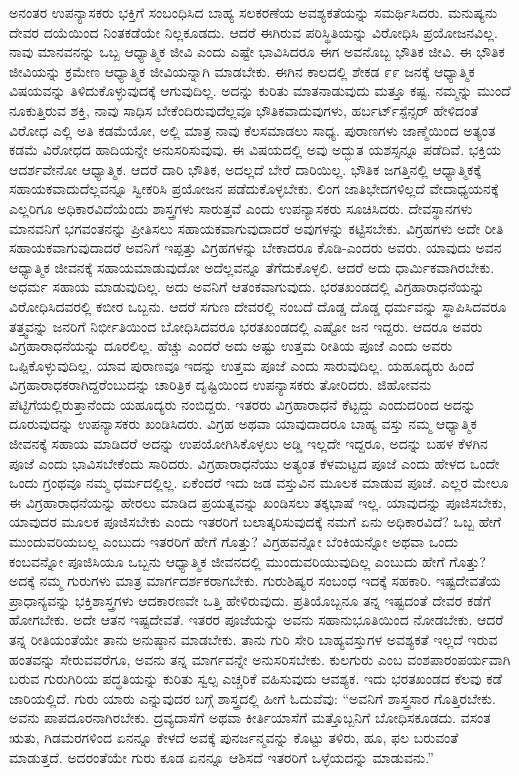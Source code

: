 ಅನಂತರ ಉಪನ್ಯಾಸಕರು ಭಕ್ತಿಗೆ ಸಂಬಂಧಿಸಿದ ಬಾಹ್ಯ ಸಲಕರಣೆಯ ಅವಶ್ಯಕತೆಯನ್ನು ಸಮರ್ಥಿಸಿದರು. ಮನುಷ್ಯನು ದೇವರ ದಯೆಯಿಂದ ನಿಂತಕಡೆಯೇ ನಿಲ್ಲಕೂಡದು. ಆದರೆ ಈಗಿರುವ ಪರಿಸ್ಥಿತಿಯನ್ನು ವಿರೋಧಿಸಿ ಪ್ರಯೋಜನವಿಲ್ಲ. ನಾವು ಮಾನವನನ್ನು ಒಬ್ಬ ಆಧ್ಯಾತ್ಮಿಕ ಜೀವಿ ಎಂದು ಎಷ್ಟೇ ಭಾವಿಸಿದರೂ ಈಗ ಅವನೊಬ್ಬ ಭೌತಿಕ ಜೀವಿ. ಈ ಭೌತಿಕ ಜೀವಿಯನ್ನು ಕ್ರಮೇಣ ಆಧ್ಯಾತ್ಮಿಕ ಜೀವಿಯನ್ನಾಗಿ ಮಾಡಬೇಕು. ಈಗಿನ ಕಾಲದಲ್ಲಿ ಶೇಕಡ ೯೯ ಜನಕ್ಕೆ ಆಧ್ಯಾತ್ಮಿಕ ವಿಷಯವನ್ನು ತಿಳಿದುಕೊಳ್ಳುವುದಕ್ಕೆ ಆಗುವುದಿಲ್ಲ. ಅದನ್ನು ಕುರಿತು ಮಾತನಾಡುವುದು ಮತ್ತೂ ಕಷ್ಟ. ನಮ್ಮನ್ನು ಮುಂದೆ ನೂಕುತ್ತಿರುವ ಶಕ್ತಿ, ನಾವು ಸಾಧಿಸ ಬೇಕೆಂದಿರುವುದೆಲ್ಲವೂ ಭೌತಿಕವಾದುವುಗಳು, ಹರ್ಬರ್ಟ್​ ಸ್ಪೆನ್ಸರ್​ ಹೇಳಿದಂತೆ ವಿರೋಧ ಎಲ್ಲಿ ಅತಿ ಕಡಮೆಯೋ, ಅಲ್ಲಿ ಮಾತ್ರ ನಾವು ಕೆಲಸಮಾಡಲು ಸಾಧ್ಯ. ಪುರಾಣಗಳು ಜಾಣ್ಮೆಯಿಂದ ಅತ್ಯಂತ ಕಡಮೆ ವಿರೋಧದ ಹಾದಿಯನ್ನೇ ಅನುಸರಿಸುವುವು. ಈ ವಿಷಯದಲ್ಲಿ ಅವು ಅದ್ಭುತ ಯಶಸ್ಸನ್ನೂ ಪಡೆದಿವೆ. ಭಕ್ತಿಯ ಆದರ್ಶವೇನೋ ಆಧ್ಯಾತ್ಮಿಕ. ಆದರೆ ದಾರಿ ಭೌತಿಕ, ಅದಲ್ಲದೆ ಬೇರೆ ದಾರಿಯಿಲ್ಲ. ಭೌತಿಕ ಜಗತ್ತಿನಲ್ಲಿ ಆಧ್ಯಾತ್ಮಿಕಕ್ಕೆ ಸಹಾಯಕವಾದುದೆಲ್ಲವನ್ನೂ ಸ್ವೀಕರಿಸಿ ಪ್ರಯೋಜನ ಪಡೆದುಕೊಳ್ಳಬೇಕು. ಲಿಂಗ ಜಾತಿಭೇದಗಳಿಲ್ಲದೆ ವೇದಾಧ್ಯಯನಕ್ಕೆ ಎಲ್ಲರಿಗೂ ಅಧಿಕಾರವಿದೆಯೆಂದು ಶಾಸ್ತ್ರಗಳು ಸಾರುತ್ತವೆ ಎಂದು ಉಪನ್ಯಾಸಕರು ಸೂಚಿಸಿದರು. ದೇವಸ್ಥಾನಗಳು ಮಾನವನಿಗೆ ಭಗವಂತನನ್ನು ಪ್ರೀತಿಸಲು ಸಹಾಯಕವಾಗುವುದಾದರೆ ಅವುಗಳನ್ನು ಕಟ್ಟಿಸಬೇಕು. ವಿಗ್ರಹಗಳು ಅದೇ ರೀತಿ ಸಹಾಯಕವಾಗುವುದಾದರೆ ಅವನಿಗೆ ಇಪ್ಪತ್ತು ವಿಗ್ರಹಗಳನ್ನು ಬೇಕಾದರೂ ಕೊಡಿ-ಎಂದರು ಅವರು. ಯಾವುದು ಅವನ ಆಧ್ಯಾತ್ಮಿಕ ಜೀವನಕ್ಕೆ ಸಹಾಯಮಾಡುವುದೋ ಅದೆಲ್ಲವನ್ನೂ ತೆಗೆದುಕೊಳ್ಳಲಿ. ಆದರೆ ಅದು ಧಾರ್ಮಿಕವಾಗಿರಬೇಕು. ಅಧರ್ಮ ಸಹಾಯ ಮಾಡುವುದಿಲ್ಲ. ಅದು ಅವನಿಗೆ ಆತಂಕವಾಗುವುದು. ಭರತಖಂಡದಲ್ಲಿ ವಿಗ್ರಹಾರಾಧನೆಯನ್ನು ವಿರೋಧಿಸಿದವರಲ್ಲಿ ಕಬೀರ ಒಬ್ಬನು. ಆದರೆ ಸಗುಣ ದೇವರಲ್ಲಿ ನಂಬದೆ ದೊಡ್ಡ ದೊಡ್ಡ ಧರ್ಮವನ್ನು ಸ್ಥಾಪಿಸಿದವರೂ ತತ್ತ್ವವನ್ನು ಜನರಿಗೆ ನಿರ್ಭೀತಿಯಿಂದ ಬೋಧಿಸಿದವರೂ ಭರತಖಂಡದಲ್ಲಿ ಎಷ್ಟೋ ಜನ ಇದ್ದರು. ಆದರೂ ಅವರು ವಿಗ್ರಹಾರಾಧನೆಯನ್ನು ದೂರಲಿಲ್ಲ. ಹೆಚ್ಚು ಎಂದರೆ ಅದು ಅಷ್ಟು ಉತ್ತಮ ರೀತಿಯ ಪೂಜೆ ಎಂದು ಅವರು ಒಪ್ಪಿಕೊಳ್ಳುವುದಿಲ್ಲ. ಯಾವ ಪುರಾಣವೂ ಇದನ್ನು ಉತ್ತಮ ಪೂಜೆ ಎಂದು ಸಾರುವುದಿಲ್ಲ. ಯಹೂದ್ಯರು ಹಿಂದೆ ವಿಗ್ರಹಾರಾಧಕರಾಗಿದ್ದರೆಂಬುದನ್ನು ಚಾರಿತ್ರಿಕ ದೃಷ್ಟಿಯಿಂದ ಉಪನ್ಯಾಸಕರು ತೋರಿದರು. ಜಿಹೋವನು ಪೆಟ್ಟಿಗೆಯಲ್ಲಿರುತ್ತಾನೆಂದು ಯಹೂದ್ಯರು ನಂಬಿದ್ದರು. ಇತರರು ವಿಗ್ರಹಾರಾಧನೆ ಕೆಟ್ಟದ್ದು ಎಂದುದರಿಂದ ಅದನ್ನು ದೂರುವುದನ್ನು ಉಪನ್ಯಾಸಕರು ಖಂಡಿಸಿದರು. ವಿಗ್ರಹ ಅಥವಾ ಯಾವುದಾದರೂ ಬಾಹ್ಯ ವಸ್ತು ನಮ್ಮ ಆಧ್ಯಾತ್ಮಿಕ ಜೀವನಕ್ಕೆ ಸಹಾಯ ಮಾಡಿದರೆ ಅದನ್ನು ಉಪಯೋಗಿಸಿಕೊಳ್ಳಲು ಅಡ್ಡಿ ಇಲ್ಲದೇ ಇದ್ದರೂ, ಅದನ್ನು ಬಹಳ ಕೆಳಗಿನ ಪೂಜೆ ಎಂದು ಭಾವಿಸಬೇಕೆಂದು ಸಾರಿದರು. ವಿಗ್ರಹಾರಾಧನೆಯು ಅತ್ಯಂತ ಕೆಳಮಟ್ಟದ ಪೂಜೆ ಎಂದು ಹೇಳದ ಒಂದೇ ಒಂದು ಗ್ರಂಥವೂ ನಮ್ಮ ಧರ್ಮದಲ್ಲಿಲ್ಲ. ಏಕೆಂದರೆ ಇದು ಜಡ ವಸ್ತುವಿನ ಮೂಲಕ ಮಾಡುವ ಪೂಜೆ. ಎಲ್ಲರ ಮೇಲೂ ಈ ವಿಗ್ರಹಾರಾಧನೆಯನ್ನು ಹೇರಲು ಮಾಡಿದ ಪ್ರಯತ್ನವನ್ನು ಖಂಡಿಸಲು ತಕ್ಕಭಾಷೆ ಇಲ್ಲ. ಯಾವುದನ್ನು ಪೂಜಿಸಬೇಕು, ಯಾವುದರ ಮೂಲಕ ಪೂಜಿಸಬೇಕು ಎಂದು ಇತರರಿಗೆ ಬಲಾತ್ಕರಿಸುವುದಕ್ಕೆ ನಮಗೆ ಏನು ಅಧಿಕಾರವಿದೆ? ಒಬ್ಬ ಹೇಗೆ ಮುಂದುವರಿಯಬಲ್ಲ ಎಂಬುದು ಇತರರಿಗೆ ಹೇಗೆ ಗೊತ್ತು? ವಿಗ್ರಹವನ್ನೋ ಬೆಂಕಿಯನ್ನೋ ಅಥವಾ ಒಂದು ಕಂಬವನ್ನೋ ಪೂಜಿಸಿಯೂ ಒಬ್ಬನು ಆಧ್ಯಾತ್ಮಿಕ ಜೀವನದಲ್ಲಿ ಮುಂದುವರಿಯುವುದಿಲ್ಲ ಎಂಬುದು ಹೇಗೆ ಗೊತ್ತು? ಅದಕ್ಕೆ ನಮ್ಮ ಗುರುಗಳು ಮಾತ್ರ ಮಾರ್ಗದರ್ಶಕರಾಗಬೇಕು. ಗುರುಶಿಷ್ಯರ ಸಂಬಂಧ ಇದಕ್ಕೆ ಸಹಕಾರಿ. ಇಷ್ಟದೇವತೆಯ ಪ್ರಾಧಾನ್ಯವನ್ನು ಭಕ್ತಿಶಾಸ್ತ್ರಗಳು ಆದಕಾರಣವೇ ಒತ್ತಿ ಹೇಳಿರುವುದು. ಪ್ರತಿಯೊಬ್ಬನೂ ತನ್ನ ಇಷ್ಟದಂತೆ ದೇವರ ಕಡೆಗೆ ಹೋಗಬೇಕು. ಅದೇ ಆತನ ಇಷ್ಟದೇವತೆ. ಇತರರ ಪೂಜೆಯನ್ನು ಅವನು ಸಹಾನುಭೂತಿಯಿಂದ ನೋಡಬೇಕು. ಆದರೆ ತನ್ನ ರೀತಿಯಂತೆಯೇ ತಾನು ಅನುಷ್ಠಾನ ಮಾಡಬೇಕು. ತಾನು ಗುರಿ ಸೇರಿ ಬಾಹ್ಯವಸ್ತುಗಳ ಅವಶ್ಯಕತೆ ಇಲ್ಲದೆ ಇರುವ ಹಂತವನ್ನು ಸೇರುವವರೆಗೂ, ಅವನು ತನ್ನ ಮಾರ್ಗವನ್ನೇ ಅನುಸರಿಸಬೇಕು. ಕುಲಗುರು ಎಂಬ ವಂಶಪಾರಂಪರ್ಯವಾಗಿ ಬರುವ ಗುರುಗಿರಿಯ ಪದ್ಧತಿಯನ್ನು ಕುರಿತು ಸ್ವಲ್ಪ ಎಚ್ಚರಿಕೆ ವಹಿಸುವುದು ಆವಶ್ಯಕ. ಇದು ಭರತಖಂಡದ ಕೆಲವು ಕಡೆ ಜಾರಿಯಲ್ಲಿದೆ. ಗುರು ಯಾರು ಎನ್ನುವುದರ ಬಗ್ಗೆ ಶಾಸ್ತ್ರದಲ್ಲಿ ಹೀಗೆ ಓದುವೆವು: “ಅವನಿಗೆ ಶಾಸ್ತ್ರಸಾರ ಗೊತ್ತಿರಬೇಕು. ಅವನು ಪಾಪದೂರನಾಗಿರಬೇಕು. ದ್ರವ್ಯದಾಸೆಗೆ ಅಥವಾ ಕೀರ್ತಿಯಾಸೆಗೆ ಮತ್ತೊಬ್ಬನಿಗೆ ಬೋಧಿಸಕೂಡದು. ವಸಂತ ಋತು, ಗಿಡಮರಗಳಿಂದ ಏನನ್ನೂ ಕೇಳದೆ ಅವಕ್ಕೆ ಪುನರ್ಜನ್ಮವನ್ನು ಕೊಟ್ಟು ತಳಿರು, ಹೂ, ಫಲ ಬರುವಂತೆ ಮಾಡುತ್ತದೆ. ಅದರಂತೆಯೇ ಗುರು ಕೂಡ ಏನನ್ನೂ ಆಶಿಸದೆ ಇತರರಿಗೆ ಒಳ್ಳೆಯದನ್ನು ಮಾಡುವನು.” 